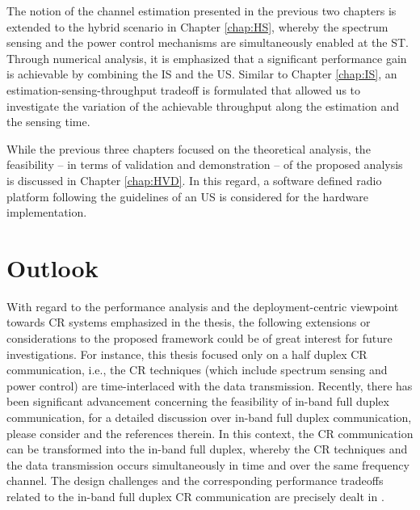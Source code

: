 The notion of the channel estimation presented in the previous two chapters is extended to the hybrid scenario in Chapter \ref{chap:HS}, whereby the spectrum sensing and the power control mechanisms are simultaneously enabled at the ST. Through numerical analysis, it is emphasized that a significant performance gain is achievable by combining the IS and the US. Similar to Chapter \ref{chap:IS}, an estimation-sensing-throughput tradeoff is formulated that allowed us to investigate the variation of the achievable throughput along the estimation and the sensing time. 

While the previous three chapters focused on the theoretical analysis, the feasibility -- in terms of validation and demonstration -- of the proposed analysis is discussed in Chapter \ref{chap:HVD}. In this regard, a software defined radio platform following the guidelines of an US is considered for the hardware implementation. 


\section{Outlook}
With regard to the performance analysis and the deployment-centric viewpoint towards CR systems emphasized in the thesis, the following extensions or considerations to the proposed framework could be of great interest for future investigations. For instance, this thesis focused only on a half duplex CR communication, i.e., the CR techniques (which include spectrum sensing and power control) are time-interlaced with the data transmission. Recently, there has been significant advancement concerning the feasibility of in-band full duplex communication, for a detailed discussion over in-band full duplex communication, please consider \cite{Bhar13, Sab14, Liu15} and the references therein. In this context, the CR communication can be transformed into the in-band full duplex, whereby the CR techniques and the data transmission occurs simultaneously in time and over the same frequency channel. The design challenges and the corresponding performance tradeoffs related to the in-band full duplex CR communication are precisely dealt in \cite{Liao15, Kim15}. 

